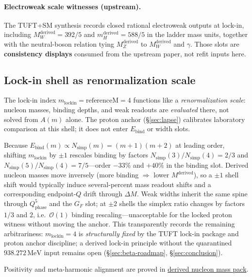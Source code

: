 \documentclass[11pt,notitlepage]{amsart}
\begin{document}
\paragraph{Electroweak scale witnesses (upstream).}
The TUFT+SM synthesis \cite{hqiv-tuft-sm-lagrangian-paper} records closed rational
electroweak outputs at lock-in, including $M_W^{\mathrm{derived}}=392/5$ and
$m_H^{\mathrm{derived}}=588/5$ in the ladder mass units, together with the neutral-boson
relation tying $M_Z^{\mathrm{derived}}$ to $M_W^{\mathrm{derived}}$ and $\gamma$. Those
slots are \textbf{consistency displays} consumed from the upstream paper, not refit
inputs here.

\subsection{Lock-in shell as renormalization scale}
\label{sec:lockin-sensitivity}

The lock-in index $m_{\mathrm{lockin}}=\mathrm{referenceM}=4$ functions like a
\emph{renormalization scale}: nucleon masses, binding depths, and weak readouts are
\emph{evaluated} there, not solved from $A(m)$ alone. The proton anchor
(\S\ref{sec:lapse}) calibrates laboratory comparison at this shell; it does not enter
$E_{\mathrm{bind}}$ or width slots.

Because $E_{\mathrm{bind}}(m)\propto N_{\mathrm{simp}}(m)=(m+1)(m+2)$ at leading order,
shifting $m_{\mathrm{lockin}}$ by $\pm 1$ rescales binding by factors
$N_{\mathrm{simp}}(3)/N_{\mathrm{simp}}(4)=2/3$ and
$N_{\mathrm{simp}}(5)/N_{\mathrm{simp}}(4)=7/5$---order $-33\%$ and $+40\%$ in the
binding slot. Derived nucleon masses move inversely (more binding $\Rightarrow$ lower
$M^{\mathrm{derived}}$), so a $\pm 1$ shell shift would typically induce several-percent
mass readout shifts and a corresponding endpoint-$Q$ drift through $\Delta M$. Weak
widths inherit the same spine through $Q_{\mathrm{phase}}^5$ and the $G_F$ slot; at
$\pm 2$ shells the simplex ratio changes by factors $1/3$ and $2$, i.e.\ $\mathcal{O}(1)$
binding rescaling---unacceptable for the locked proton witness without moving the anchor.
This transparently records the remaining arbitrariness: $m_{\mathrm{lockin}}=4$ is
\emph{structurally fixed} by the TUFT lock-in package and proton anchor discipline;
a derived lock-in principle without the quarantined $938.272\,\mathrm{MeV}$ input remains
open (\S\ref{sec:beta-roadmap}, \S\ref{sec:conclusion}).

Positivity and meta-harmonic alignment are proved in
\hyperref[lean:derived-nucleon-pack]{derived nucleon mass pack}.
\end{document}
